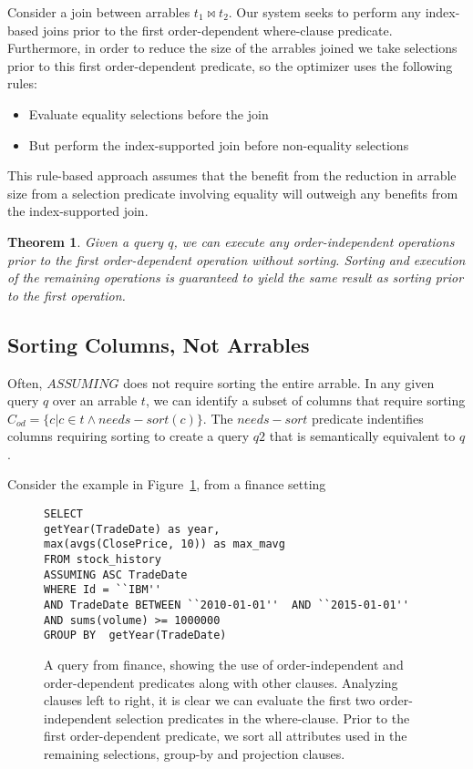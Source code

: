 \documentclass{acm_proc_article-sp}
\newtheorem{theorem}{Theorem}[section]
\begin{document}
Consider a join between arrables $t_1 \bowtie t_2$. Our system seeks to perform any index-based
joins prior to the first order-dependent where-clause predicate. Furthermore, in order to reduce the size of the
arrables joined we take selections prior to this first order-dependent predicate, so the optimizer uses the following rules:

 \begin{itemize}
 \item  Evaluate equality selections before the join
 \item  But perform the index-supported join before non-equality selections
 \end{itemize}
 
This rule-based approach assumes that the benefit from the reduction in arrable size from a selection predicate involving equality will outweigh any benefits from the index-supported join.
 
\begin{theorem}
Given a query $q$, we can execute any order-independent operations prior to the first order-dependent operation without sorting. Sorting and execution of the remaining operations is guaranteed to yield the same result
as sorting prior to the first operation.
\end{theorem}


\subsection{Sorting Columns, Not Arrables}
Often, $ASSUMING$ does not require sorting the entire arrable. In any given query $q$ over an arrable $t$, we can identify a subset of columns that require sorting $C_{od}=\{c | c \in t \land needs-sort(c)\}$. The $needs-sort$ predicate indentifies columns requiring sorting to create a query $q2$ that is semantically equivalent to $q$.

Consider the example in Figure~\ref{sort-cols-ex}, from a finance setting

\begin{figure}[]
\begin{lstlisting}
SELECT 
getYear(TradeDate) as year,
max(avgs(ClosePrice, 10)) as max_mavg
FROM stock_history
ASSUMING ASC TradeDate
WHERE Id = ``IBM''  
AND TradeDate BETWEEN ``2010-01-01''  AND ``2015-01-01''
AND sums(volume) >= 1000000 
GROUP BY  getYear(TradeDate)
\end{lstlisting}
\caption{A query from finance, showing the use of order-independent and order-dependent predicates along
with other clauses. Analyzing clauses left to right, it is clear we can evaluate the first two order-independent selection predicates in the where-clause. Prior to the first order-dependent predicate, we sort all attributes used
in the remaining selections, group-by and projection clauses.}
\label{sort-cols-ex}
\end{figure}
\end{document}
